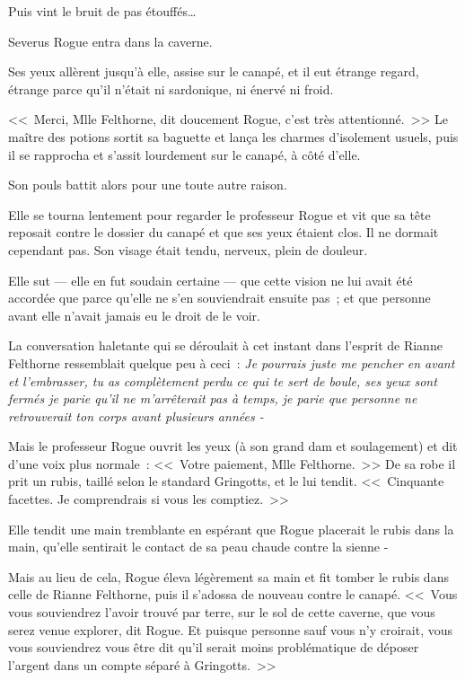 Puis vint le bruit de pas étouffés…

Severus Rogue entra dans la caverne.

Ses yeux allèrent jusqu'à elle, assise sur le canapé, et il eut étrange regard, étrange parce qu'il n'était ni sardonique, ni énervé ni froid.

<<~Merci, Mlle Felthorne, dit doucement Rogue, c'est très attentionné.~>> Le maître des potions sortit sa baguette et lança les charmes d'isolement usuels, puis il se rapprocha et s'assit lourdement sur le canapé, à côté d'elle.

Son pouls battit alors pour une toute autre raison.

Elle se tourna lentement pour regarder le professeur Rogue et vit que sa tête reposait contre le dossier du canapé et que ses yeux étaient clos. Il ne dormait cependant pas. Son visage était tendu, nerveux, plein de douleur.

Elle sut — elle en fut soudain certaine — que cette vision ne lui avait été accordée que parce qu'elle ne s'en souviendrait ensuite pas~; et que personne avant elle n'avait jamais eu le droit de le voir.

La conversation haletante qui se déroulait à cet instant dans l'esprit de Rianne Felthorne ressemblait quelque peu à ceci~: \emph{Je pourrais juste me pencher en avant et l'embrasser, tu as complètement perdu ce qui te sert de boule, ses yeux sont fermés je parie qu'il ne m'arrêterait pas à temps, je parie que personne ne retrouverait ton corps avant plusieurs années -}

Mais le professeur Rogue ouvrit les yeux (à son grand dam et soulagement) et dit d'une voix plus normale~: <<~Votre paiement, Mlle Felthorne.~>> De sa robe il prit un rubis, taillé selon le standard Gringotts, et le lui tendit. <<~Cinquante facettes. Je comprendrais si vous les comptiez.~>>

Elle tendit une main tremblante en espérant que Rogue placerait le rubis dans la main, qu'elle sentirait le contact de sa peau chaude contre la sienne -

Mais au lieu de cela, Rogue éleva légèrement sa main et fit tomber le rubis dans celle de Rianne Felthorne, puis il s'adossa de nouveau contre le canapé. <<~Vous vous souviendrez l'avoir trouvé par terre, sur le sol de cette caverne, que vous serez venue explorer, dit Rogue. Et puisque personne sauf vous n'y croirait, vous vous souviendrez vous être dit qu'il serait moins problématique de déposer l'argent dans un compte séparé à Gringotts.~>>

